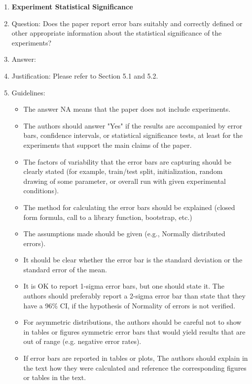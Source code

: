 \documentclass{article}
\begin{document}
\begin{enumerate}
\item {\bf Experiment Statistical Significance}
    \item[] Question: Does the paper report error bars suitably and correctly defined or other appropriate information about the statistical significance of the experiments?
    \item[] Answer: \answerYes{} %
    \item[] Justification: Please refer to Section 5.1 and 5.2.
    \item[] Guidelines:
    \begin{itemize}
        \item The answer NA means that the paper does not include experiments.
        \item The authors should answer "Yes" if the results are accompanied by error bars, confidence intervals, or statistical significance tests, at least for the experiments that support the main claims of the paper.
        \item The factors of variability that the error bars are capturing should be clearly stated (for example, train/test split, initialization, random drawing of some parameter, or overall run with given experimental conditions).
        \item The method for calculating the error bars should be explained (closed form formula, call to a library function, bootstrap, etc.)
        \item The assumptions made should be given (e.g., Normally distributed errors).
        \item It should be clear whether the error bar is the standard deviation or the standard error of the mean.
        \item It is OK to report 1-sigma error bars, but one should state it. The authors should preferably report a 2-sigma error bar than state that they have a 96\% CI, if the hypothesis of Normality of errors is not verified.
        \item For asymmetric distributions, the authors should be careful not to show in tables or figures symmetric error bars that would yield results that are out of range (e.g. negative error rates).
        \item If error bars are reported in tables or plots, The authors should explain in the text how they were calculated and reference the corresponding figures or tables in the text.
    \end{itemize}


\end{enumerate}
\end{document}
